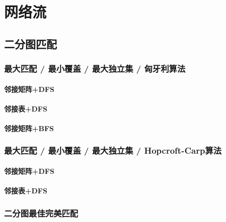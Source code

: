 
\chapter{网络流}
\label{network}

\newcommand{\prefixnetwork}[1]{network/#1}


\section{二分图匹配}

\subsection{最大匹配 / 最小覆盖 / 最大独立集 / 匈牙利算法}
\subsubsection{邻接矩阵+DFS}


\subsubsection{邻接表+DFS}


\subsubsection{邻接矩阵+BFS}


\subsection{最大匹配 / 最小覆盖 / 最大独立集 / Hopcroft-Carp算法}
\subsubsection{邻接矩阵+DFS}


\subsubsection{邻接表+DFS}


\subsection{二分图最佳完美匹配}


